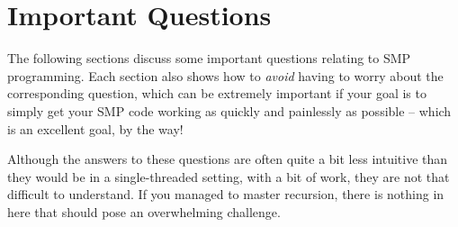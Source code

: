 
\chapter{Important Questions}
\label{cha:app:Important Questions}


The following sections discuss some important questions relating to
SMP programming.
Each section also shows how to {\em avoid} having to worry about
the corresponding question, which can be extremely important if 
your goal is to simply get your SMP code working as quickly and
painlessly as possible -- which is an excellent goal, by the way!

Although the answers to these questions are often quite a bit less
intuitive than they would be in a single-threaded setting,
with a bit of work, they are not that difficult to understand.
If you managed to master recursion, there is nothing in here that should
pose an overwhelming challenge.




